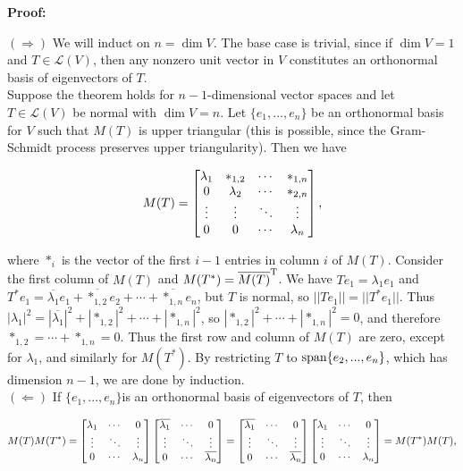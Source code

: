 \documentclass{article}
\theoremstyle{colontheorem}
\newcommand{\Span}{\textnormal{span}}
\newenvironment{Proof}
{
	\vspace{-.3in}
	
	\begin{mdframed}[backgroundcolor=ProofPurple!10]
	\textbf{Proof:}%
}
{
	\end{mdframed}
	
	\vspace{.15in}
}
\begin{document}
\begin{Proof}
	$(\Rightarrow)$ We will induct on $n = \dim V$. The base case is trivial, since if $\dim V = 1$ and $T \in \mathcal{L}(V)$, then any nonzero unit vector in $V$ constitutes an orthonormal basis of eigenvectors of $T$.\\
	
	Suppose the theorem holds for $n - 1$-dimensional vector spaces and let $T \in \mathcal{L}(V)$ be normal with $\dim V = n$. Let $\{e_1, ..., e_n\}$ be an orthonormal basis for $V$ such that $M(T)$ is upper triangular (this is possible, since the Gram-Schmidt process preserves upper triangularity). Then we have
	
	$$
		M(T) = \begin{bmatrix}
			\lambda_1 & *_{1,2} & \cdots & *_{1,n}\\
			0 & \lambda_2 & \cdots & *_{2,n}\\
			\vdots & \vdots & \ddots & \vdots\\
			0 & 0 & \cdots & \lambda_n 
		\end{bmatrix} \textnormal{,}
	$$
	
	where $*_i$ is the vector of the first $i - 1$ entries in column $i$ of $M(T)$. Consider the first column of $M(T)$ and $M(T^*) = \overline{M(T)}^\textnormal{T}$. We have $Te_1 = \lambda_1 e_1$ and $T^* e_1 = \overline{\lambda_1} e_1 + \overline{*_{1,2}} e_2 + \cdots + \overline{*_{1,n}} e_n$, but $T$ is normal, so $||Te_1|| = ||T^* e_1||$. Thus $|\lambda_1|^2 = |\overline{\lambda_1}|^2 + |*_{1,2}|^2 + \cdots + |*_{1,n}|^2$, so $|*_{1,2}|^2 + \cdots + |*_{1,n}|^2 = 0$, and therefore $*_{1,2} = \cdots + *_{1,n} = 0$. Thus the first row and column of $M(T)$ are zero, except for $\lambda_1$, and similarly for $M(T^*)$. By restricting $T$ to $\Span \{e_2, ..., e_n\}$, which has dimension $n - 1$, we are done by induction.\\
	
	$(\Leftarrow)$ If $\{e_1, ..., e_n\}$is an orthonormal basis of eigenvectors of $T$, then
	
	$$
		M(T)M(T^*) = \begin{bmatrix}
			\lambda_1 & \cdots & 0\\
			\vdots & \ddots & \vdots\\
			0 & \cdots & \lambda_n
		\end{bmatrix} \begin{bmatrix}	
			\overline{\lambda_1} & \cdots & 0\\
			\vdots & \ddots & \vdots\\
			0 & \cdots & \overline{\lambda_n} 
		\end{bmatrix} = \begin{bmatrix}
			\overline{\lambda_1} & \cdots & 0\\
			\vdots & \ddots & \vdots\\
			0 & \cdots & \overline{\lambda_n} 
		\end{bmatrix} \begin{bmatrix}
			\lambda_1 & \cdots & 0\\
			\vdots & \ddots & \vdots\\
			0 & \cdots & \lambda_n
		\end{bmatrix} = M(T^*) M(T) \textnormal{,}
	$$
	

\end{Proof}
\end{document}
